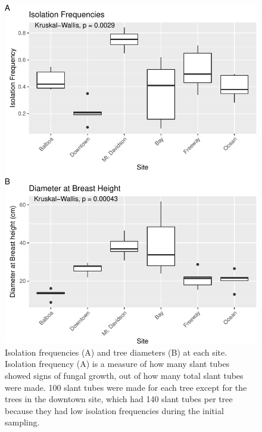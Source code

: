 \documentclass[fleqn,10pt,lineno]{wlpeerj} %
\begin{document}
\begin{figure}
\centering
\includegraphics{gibson2021_files/figure-latex/isolation-1.pdf}
\caption{\label{fig:isolation}Isolation frequencies (A) and tree diameters (B) at each site. Isolation frequency (A) is a measure of how many slant tubes showed signs of fungal growth, out of how many total slant tubes were made. 100 slant tubes were made for each tree except for the trees in the downtown site, which had 140 slant tubes per tree because they had low isolation frequencies during the initial sampling.}
\end{figure}
\end{document}

